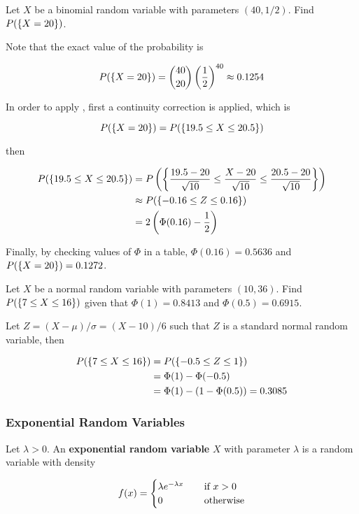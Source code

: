 \documentclass[a4paper,12pt]{article}
\begin{document}
\begin{exm}
  Let $X$ be a binomial random variable with parameters $(40,1/2)$. Find $P(\left\{ X=20\right\})$.\n

  \ans Note that the exact value of the probability is

  $$P(\left\{ X=20\right\})=\binom{40}{20}\left( \frac{1}{2}\right)^{40}\approx 0.1254$$\s

  In order to apply \rthm[\sctd{1}], first a continuity correction is applied, which is

  $$P(\left\{ X=20\right\})=P(\left\{ 19.5\leq X\leq 20.5\right\})$$\s

  then

  $$\begin{aligned}[t]
    P(\left\{ 19.5\leq X\leq 20.5\right\})&=P\left( \left\{ \frac{19.5-20}{\sqrt{10}}\leq\frac{X-20}{\sqrt{10}}\leq\frac{20.5-20}{\sqrt{10}}\right\}\right)\\
    &\approx P(\left\{ -0.16\leq Z\leq 0.16\right\})\\
    &=2\left( \Phi(0.16)-\frac{1}{2}\right)
  \end{aligned}$$\s

  Finally, by checking values of $\Phi$ in a table, $\Phi(0.16)=0.5636$ and $P(\left\{ X=20\right\})=0.1272$.
\end{exm}

\begin{exm}
  Let $X$ be a normal random variable with parameters $(10,36)$. Find $P(\left\{ 7\leq X\leq 16\right\})$ given that $\Phi(1)=0.8413$ and $\Phi(0.5)=0.6915$.\n

  \ans Let $Z=(X-\mu)/\sigma=(X-10)/6$ such that $Z$ is a standard normal random variable, then

  $$\begin{aligned}[t]
    P(\left\{ 7\leq X\leq 16\right\})&=P(\left\{ -0.5\leq Z\leq 1\right\})\\
    &=\Phi(1)-\Phi(-0.5)\\
    &=\Phi(1)-(1-\Phi(0.5))=0.3085
  \end{aligned}$$
\end{exm}

\subsubsection{Exponential Random Variables}
\begin{dft}
  Let $\lambda>0$. An \textbf{exponential random variable} $X$ with parameter $\lambda$ is a random variable with density

  $$f(x)=\begin{cases}
    \lambda e^{-\lambda x}&\;\;\;\;\text{if }x>0\\
    0&\;\;\;\;\text{otherwise}
  \end{cases}$$
\end{dft}\n
\end{document}
